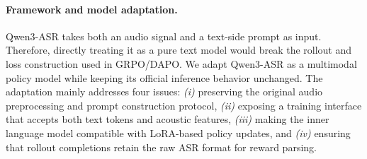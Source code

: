 \documentclass{llmxive}
\begin{document}
\paragraph{Framework and model adaptation.}
Qwen3-ASR takes both an audio signal and a text-side prompt as input. Therefore,
directly treating it as a pure text model would break the rollout and loss
construction used in GRPO/DAPO. We adapt Qwen3-ASR as a multimodal policy model
while keeping its official inference behavior unchanged. The adaptation mainly
addresses four issues: \textit{(i)} preserving the original audio preprocessing
and prompt construction protocol, \textit{(ii)} exposing a training interface that
accepts both text tokens and acoustic features, \textit{(iii)} making the inner
language model compatible with LoRA-based policy updates, and \textit{(iv)}
ensuring that rollout completions retain the raw ASR format for reward parsing.
\end{document}
